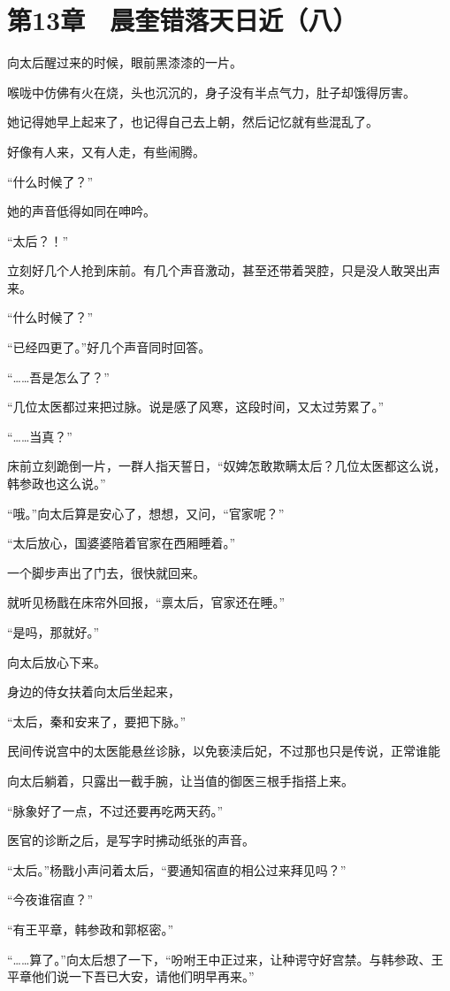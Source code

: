\section{第13章　晨奎错落天日近（八）}

向太后醒过来的时候，眼前黑漆漆的一片。

喉咙中仿佛有火在烧，头也沉沉的，身子没有半点气力，肚子却饿得厉害。

她记得她早上起来了，也记得自己去上朝，然后记忆就有些混乱了。

好像有人来，又有人走，有些闹腾。

“什么时候了？”

她的声音低得如同在呻吟。

“太后？！”

立刻好几个人抢到床前。有几个声音激动，甚至还带着哭腔，只是没人敢哭出声来。

“什么时候了？”

“已经四更了。”好几个声音同时回答。

“……吾是怎么了？”

“几位太医都过来把过脉。说是感了风寒，这段时间，又太过劳累了。”

“……当真？”

床前立刻跪倒一片，一群人指天誓日，“奴婢怎敢欺瞒太后？几位太医都这么说，韩参政也这么说。”

“哦。”向太后算是安心了，想想，又问，“官家呢？”

“太后放心，国婆婆陪着官家在西厢睡着。”

一个脚步声出了门去，很快就回来。

就听见杨戬在床帘外回报，“禀太后，官家还在睡。”

“是吗，那就好。”

向太后放心下来。

身边的侍女扶着向太后坐起来，

“太后，秦和安来了，要把下脉。”

民间传说宫中的太医能悬丝诊脉，以免亵渎后妃，不过那也只是传说，正常谁能

向太后躺着，只露出一截手腕，让当值的御医三根手指搭上来。

“脉象好了一点，不过还要再吃两天药。”

医官的诊断之后，是写字时拂动纸张的声音。

“太后。”杨戬小声问着太后，“要通知宿直的相公过来拜见吗？”

“今夜谁宿直？”

“有王平章，韩参政和郭枢密。”

“……算了。”向太后想了一下，“吩咐王中正过来，让种谔守好宫禁。与韩参政、王平章他们说一下吾已大安，请他们明早再来。”

